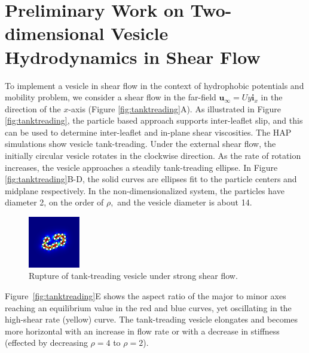 \section{Preliminary Work on Two-dimensional Vesicle Hydrodynamics in Shear Flow} 
%
To implement a vesicle in shear flow in the context of hydrophobic
potentials and mobility problem, we consider a shear flow in the
far-field $\mathbf{u}_{\infty} = Uy\mathbf{i}_x$ in the direction of the
$x$-axis (Figure \ref{fig:tanktreading}A). As illustrated in Figure
\ref{fig:tanktreading}, the particle based approach supports
inter-leaflet slip, and this can be used to determine inter-leaflet and
in-plane shear viscosities. 
%
%
The HAP simulations show vesicle tank-treading. Under the external shear flow, the initially circular 
vesicle rotates in the clockwise direction. As the rate of rotation increases, the vesicle approaches
a steadily tank-treading ellipse. In Figure \ref{fig:tanktreading}B-D, the solid curves are ellipses fit to the particle centers
and midplane respectively. In the non-dimensionalized system, the particles have diameter 2, on the order of $\rho,$ 
and the vesicle diameter is about 14. 
%
\begin{figure}
\centerline{\includegraphics[width=0.2\textwidth]{figures/PW_fig5.pdf}}
\caption{\label{fig:rupture} Rupture of tank-treading vesicle under strong shear flow.}
\end{figure}
%
Figure~\ref{fig:tanktreading}E shows the aspect ratio of the major to minor axes reaching an equilibrium value in the 
red and blue curves, yet oscillating in the high-shear rate (yellow) curve.
The tank-treading vesicle elongates and becomes more horizontal 
with an increase in flow rate or 
with a decrease in stiffness (effected by decreasing $\rho = 4$ to $\rho = 2$). 


